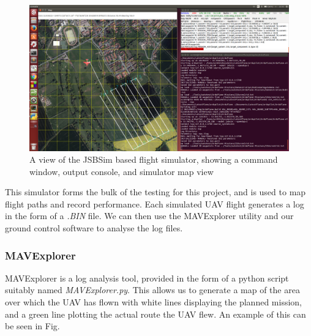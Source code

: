 \begin{figure}[htbp!] 
\centering    
\includegraphics[width=\textwidth]{JSBSim}
\caption[JSBSim Simulator]{A view of the JSBSim based flight simulator, showing a command window, output console, and simulator map view}
\label{fig:jsbsim}
\end{figure}

This simulator forms the bulk of the testing for this project, and is used to map flight paths and record performance. Each simulated UAV flight generates a log in the form of a \textit{.BIN} file. We can then use the MAVExplorer utility and our ground control software to analyse the log files. 

\subsubsection{MAVExplorer}
\label{intro:mavexplorer}
MAVExplorer is a log analysis tool, provided in the form of a python script suitably named \textit{MAVExplorer.py}. This allows us to generate a map of the area over which the UAV has flown with white lines displaying the planned mission, and a green line plotting the actual route the UAV flew. An example of this can be seen in Fig. %

